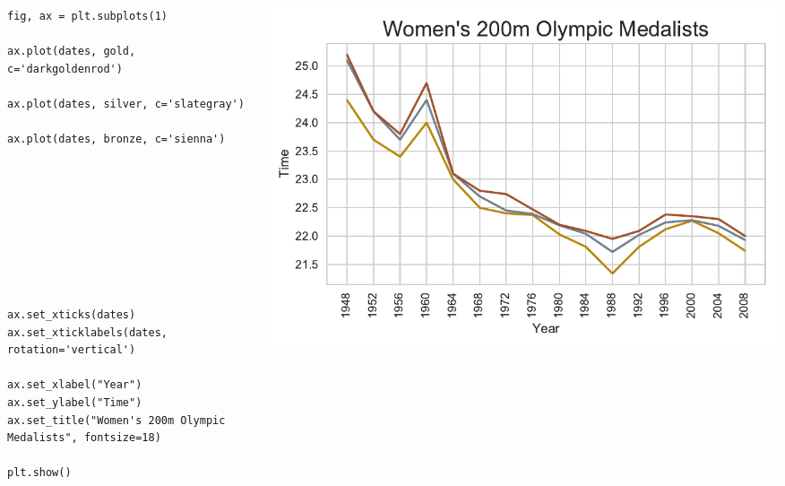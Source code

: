 \documentclass{beamer}
\begin{document}
\begin{frame}[fragile]
\tiny{
\begin{columns}
\begin{column}{0.45\textwidth}
\begin{verbatim}
fig, ax = plt.subplots(1)

ax.plot(dates, gold, c='darkgoldenrod')

ax.plot(dates, silver, c='slategray')

ax.plot(dates, bronze, c='sienna')









ax.set_xticks(dates)
ax.set_xticklabels(dates, rotation='vertical')

ax.set_xlabel("Year")
ax.set_ylabel("Time")
ax.set_title("Women's 200m Olympic Medalists", fontsize=18)

plt.show()
\end{verbatim}
\end{column}
\begin{column}{0.55\textwidth}
\includegraphics[width=\textwidth]{olympics_4.pdf}
\end{column}
\end{columns}
}
\end{frame}
\end{document}
